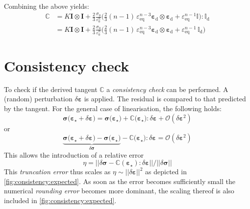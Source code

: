 \documentclass[namecite, fleqn]{goose-article}
\begin{document}
Combining the above yields:
\begin{align}
    \mathbb{C}
    &= K \bm{I} \otimes \bm{I} +
    \frac{2}{3} \frac{\sigma_0}{\varepsilon_0^n}
    \bigg(
        \tfrac{2}{3} (n-1) \, \varepsilon_\mathrm{eq}^{n-3}
        \bm{\varepsilon}_\mathrm{d} \otimes \bm{\varepsilon}_\mathrm{d}
        + \varepsilon_\mathrm{eq}^{n-1} \mathbb{I}
    \bigg) : \mathbb{I}_\mathrm{d} \\
    &= K \bm{I} \otimes \bm{I} +
    \frac{2}{3} \frac{\sigma_0}{\varepsilon_0^n}
    \bigg(
        \tfrac{2}{3} (n-1) \, \varepsilon_\mathrm{eq}^{n-3}
        \bm{\varepsilon}_\mathrm{d} \otimes \bm{\varepsilon}_\mathrm{d}
        + \varepsilon_\mathrm{eq}^{n-1} \, \mathbb{I}_\mathrm{d}
    \bigg)
\end{align}

\section{Consistency check}

To check if the derived tangent $\mathbb{C}$ a \emph{consistency check} can be performed.
A (random) perturbation $\delta \bm{\varepsilon}$ is applied.
The residual is compared to that predicted by the tangent.
For the general case of linearisation, the following holds:
\begin{equation}
    \bm{\sigma}\big( \bm{\varepsilon}_\star + \delta \bm{\varepsilon} \big) =
    \bm{\sigma}\big( \bm{\varepsilon}_\star \big) +
    \mathbb{C} \big( \bm{\varepsilon}_\star \big) : \delta \bm{\varepsilon} +
    \mathcal{O}(\delta \bm{\varepsilon}^2)
\end{equation}
or
\begin{equation}
    \underbrace{
        \bm{\sigma}\big( \bm{\varepsilon}_\star + \delta \bm{\varepsilon} \big) -
        \bm{\sigma}\big( \bm{\varepsilon}_\star \big)
    }_{
        \displaystyle \delta \bm{\sigma}
    } -
    \mathbb{C} \big( \bm{\varepsilon}_\star \big) : \delta \bm{\varepsilon} =
    \mathcal{O}(\delta \bm{\varepsilon}^2)
\end{equation}
This allows the introduction of a relative error
\begin{equation}
  \eta =
  \Big|\Big|
        \delta \bm{\sigma} -
        \mathbb{C}(\bm{\varepsilon}_\star) : \delta \bm{\varepsilon}
  \Big|\Big|
  /
  \Big|\Big| \delta \bm{\sigma} \Big|\Big|
\end{equation}
This \emph{truncation error} thus scales as $\eta \sim || \delta \bm{\varepsilon} ||^2$
as depicted in \cref{fig:consistency:expected}.
As soon as the error becomes sufficiently small the numerical \emph{rounding error}
becomes more dominant, the scaling thereof is also included in \cref{fig:consistency:expected}.
\end{document}
